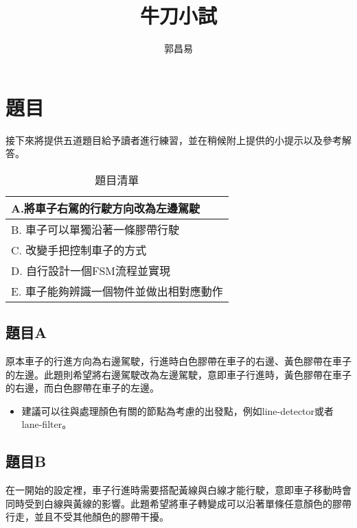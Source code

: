 \documentclass{article}
\title{牛刀小試}
\author{郭昌易}
\date{} %
\begin{document}
\maketitle

\section{題目}

接下來將提供五道題目給予讀者進行練習，並在稍候附上提供的小提示以及參考解答。

\begin{table}[h]
\caption{題目清單}

\begin{center}
\begin{tabular}{||l||}
\hline
A.將車子右駕的行駛方向改為左邊駕駛\\
\hline
B. 車子可以單獨沿著一條膠帶行駛\\
\hline
C. 改變手把控制車子的方式\\
\hline
D. 自行設計一個FSM流程並實現\\
\hline
E. 車子能夠辨識一個物件並做出相對應動作\\
\hline
\end{tabular}
\end{center}
\end{table}

\subsection{題目A}

原本車子的行進方向為右邊駕駛，行進時白色膠帶在車子的右邊、黃色膠帶在車子的左邊。此題則希望將右邊駕駛改為左邊駕駛，意即車子行進時，黃色膠帶在車子的右邊，而白色膠帶在車子的左邊。

\begin{itemize}

\item 建議可以往與處理顏色有關的節點為考慮的出發點，例如line-detector或者lane-filter。

\end{itemize}

\subsection{題目B}

在一開始的設定裡，車子行進時需要搭配黃線與白線才能行駛，意即車子移動時會同時受到白線與黃線的影響。此題希望將車子轉變成可以沿著單條任意顏色的膠帶行走，並且不受其他顏色的膠帶干擾。
\end{document}
